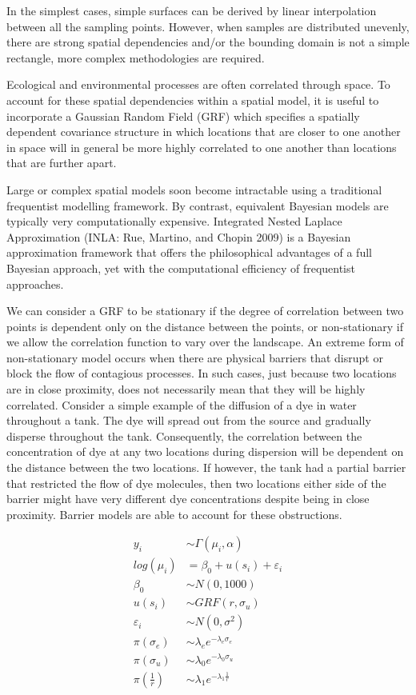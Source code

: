 \documentclass[a4paper]{article}
\begin{document}
In the simplest cases, simple surfaces can be derived by linear
interpolation between all the sampling points. However, when samples are
distributed unevenly, there are strong spatial dependencies and/or the
bounding domain is not a simple rectangle, more complex methodologies
are required.

Ecological and environmental processes are often correlated through
space. To account for these spatial dependencies within a spatial model,
it is useful to incorporate a Gaussian Random Field (GRF) which
specifies a spatially dependent covariance structure in which locations
that are closer to one another in space will in general be more highly
correlated to one another than locations that are further apart.

Large or complex spatial models soon become intractable using a
traditional frequentist modelling framework. By contrast, equivalent
Bayesian models are typically very computationally expensive. Integrated
Nested Laplace Approximation (INLA: Rue, Martino, and Chopin 2009) is a
Bayesian approximation framework that offers the philosophical
advantages of a full Bayesian approach, yet with the computational
efficiency of frequentist approaches.

We can consider a GRF to be stationary if the degree of correlation
between two points is dependent only on the distance between the points,
or non-stationary if we allow the correlation function to vary over the
landscape. An extreme form of non-stationary model occurs when there are
physical barriers that disrupt or block the flow of contagious
processes. In such cases, just because two locations are in close
proximity, does not necessarily mean that they will be highly
correlated. Consider a simple example of the diffusion of a dye in water
throughout a tank. The dye will spread out from the source and gradually
disperse throughout the tank. Consequently, the correlation between the
concentration of dye at any two locations during dispersion will be
dependent on the distance between the two locations. If however, the
tank had a partial barrier that restricted the flow of dye molecules,
then two locations either side of the barrier might have very different
dye concentrations despite being in close proximity. Barrier models are
able to account for these obstructions.

\[
\begin{align}
y_i &\sim{} \Gamma(\mu_i, \alpha)\\
log(\mu_i) &= \beta_0 + u(s_i) + \varepsilon_i\\[1em]
\beta_0 &\sim{} N(0,1000)\\
u(s_i) &\sim{} GRF(r, \sigma_u)\\ 
\varepsilon_i &\sim{} N(0, \sigma^2)\\[1em]
\pi(\sigma_e) &\sim{} \lambda_e e^{-\lambda_e \sigma_e}\\
\pi(\sigma_u) &\sim{} \lambda_0 e^{-\lambda_0 \sigma_u}\\
\pi\left(\frac{1}{r}\right) & \sim{} \lambda_1 e^{-\lambda_1 \frac{1}{r}}
\end{align}
\]
\end{document}
